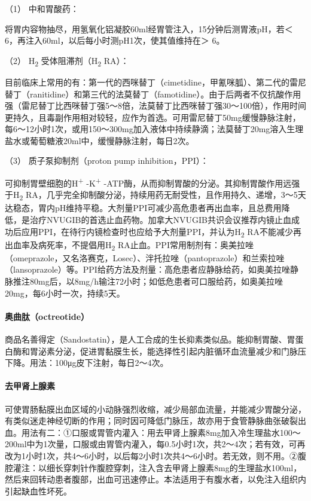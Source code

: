 \hypertarget{text00032.htmlux5cux23CHP1-13-1-5-3-2-1}{}
（1） 中和胃酸药：

将胃内容物抽尽，用氢氧化铝凝胶60ml经胃管注入，15分钟后测胃液pH，若＜
6，再注入60ml，以后每小时测pH1次，使其值维持在＞ 6。

\hypertarget{text00032.htmlux5cux23CHP1-13-1-5-3-2-2}{}
（2） H\textsubscript{2} 受体阻滞剂（H\textsubscript{2} RA）：

目前临床上常用的有：第一代的西咪替丁（cimetidine，甲氰咪胍）、第二代的雷尼替丁（ranitidine）和第三代的法莫替丁（famotidine）。由于后两者不仅抗酸作用强（雷尼替丁比西咪替丁强5～8倍，法莫替丁比西咪替丁强30～100倍），作用时间更持久，且毒副作用相对较轻，应作为首选。可用雷尼替丁50mg缓慢静脉注射，每6～12小时1次，或用150～300mg加入液体中持续静滴；法莫替丁20mg溶入生理盐水或葡萄糖液20ml中，缓慢静脉注射，每日2次。

\hypertarget{text00032.htmlux5cux23CHP1-13-1-5-3-2-3}{}
（3） 质子泵抑制剂（proton pump inhibition，PPI）：

可抑制胃壁细胞的H\textsuperscript{+} -K\textsuperscript{+}
-ATP酶，从而抑制胃酸的分泌。其抑制胃酸作用远强于H\textsubscript{2}
RA，几乎完全抑制酸分泌，持续用药无耐受性，且作用持久、递增，3～5天达稳态，胃内pH维持平稳。大剂量PPI可减少高危患者再出血率，且总费用降低，是治疗NVUGIB的首选止血药物。加拿大NVUGIB共识会议推荐内镜止血成功后应用PPI，在待行内镜检查时也应给予大剂量PPI，并认为H\textsubscript{2}
RA不能减少再出血率及病死率，不提倡用H\textsubscript{2}
RA止血。PPI常用制剂有：奥美拉唑（omeprazole，又名洛赛克，Losec）、泮托拉唑（pantoprazole）和兰索拉唑（lansoprazole）等。PPI给药方法及剂量：高危患者应静脉给药，如奥美拉唑静脉推注80mg后，以8mg/h输注72小时；如低危患者可口服给药，如奥美拉唑20mg，每6小时一次，持续5天。

\paragraph{奥曲肽（octreotide）}

商品名善得定（Sandostatin），是人工合成的生长抑素类似品。能抑制胃酸、胃蛋白酶和胃泌素分泌，促进胃黏膜生长，能选择性引起内脏循环血流量减少和门脉压下降。用法：100μg皮下注射，每日2～4次。

\paragraph{去甲肾上腺素}

可使胃肠黏膜出血区域的小动脉强烈收缩，减少局部血流量，并能减少胃酸分泌，有类似迷走神经切断的作用；同时因可降低门脉压，故亦用于食管静脉曲张破裂出血。用法有二：①口服或胃管内灌入：用去甲肾上腺素8mg加入冷生理盐水100～200ml中为1次量，口服或由胃管内灌入，每0.5小时1次，共2～4次；若有效，可再改为1小时1次，共4～6小时，以后每2小时1次共4～6小时。若无效，则不用。②腹腔灌注：以细长穿刺针作腹腔穿刺，注入含去甲肾上腺素8mg的生理盐水100ml，然后来回转动患者腹部，出血可迅速停止。本法适用于有腹水者，以免注入组织内引起缺血性坏死。

